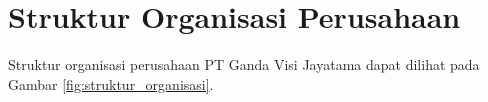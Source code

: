 \section{Struktur Organisasi Perusahaan}



Struktur organisasi perusahaan PT Ganda Visi Jayatama dapat dilihat pada Gambar \ref{fig:struktur_organisasi}.


